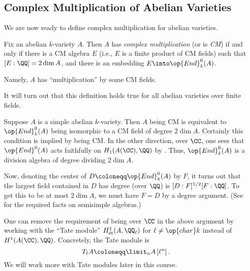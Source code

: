 \documentclass[../notes.tex]{subfiles}
\begin{document}

\subsection{Complex Multiplication of Abelian Varieties}
We are now ready to define complex multiplication for abelian varieties.
\begin{definition}
	Fix an abelian $k$-variety $A$. Then $A$ has \textit{complex multiplication} (or is \textit{CM}) if and only if there is a CM algebra $E$ (i.e., $E$ is a finite product of CM fields) such that $[E:\QQ]=2\dim A$, and there is an embedding $E\into\op{End}^0_k(A)$.
\end{definition}
Namely, $A$ has ``multiplication'' by some CM fields.
\begin{remark}
	It will turn out that this definition holds true for all abelian varieties over finite fields.
\end{remark}
\begin{remark}
	Suppose $A$ is a simple abelian $k$-variety. Then $A$ being CM is equivalent to $\op{End}^0_k(A)$ being isomorphic to a CM field of degree $2\dim A$. Certainly this condition is implied by being CM. In the other direction, over $\CC$, one sees that $\op{End}^0(A)$ acts faithfully on $H_1(A(\CC),\QQ)$ by . Thus, $\op{End}^0_k(A)$ is a division algebra of degree dividing $2\dim A$.
	
	Now, denoting the center of $D\coloneqq\op{End}^0_k(A)$ by $F$, it turns out that the largest field contained in $D$ has degree (over $\QQ$) is $[D:F]^{1/2}[F:\QQ]$. To get this to be at most $2\dim A$, we must have $F=D$ by a degree argument. (See \cite[Section~I.1]{milne-cm} for the required facts on semisimple algebras.)
\end{remark}
\begin{remark}
	One can remove the requirement of being over $\CC$ in the above argument by working with the ``Tate module'' $H^1_{\text{\'et}}(A,\QQ_\ell)$ for $\ell\ne\op{char}k$ instead of $H^1(A(\CC),\QQ)$. Concretely, the Tate module is
	\[T_\ell A\coloneqq\limit_n A\left[\ell^n\right].\]
	We will work more with Tate modules later in this course.
\end{remark}
\end{document}
